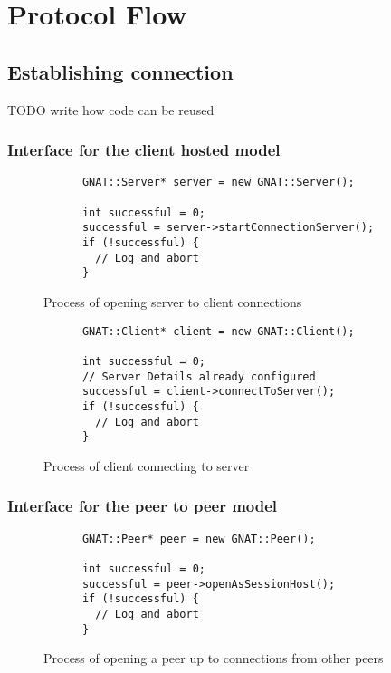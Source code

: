 
\newpage

\section{Protocol Flow}

\subsection{Establishing connection}
TODO write how code can be reused



\newpage
\subsubsection{Interface for the client hosted model}

\begin{figure}[!h]
  \centering
  \begin{lstlisting}
      GNAT::Server* server = new GNAT::Server();

      int successful = 0;
      successful = server->startConnectionServer();
      if (!successful) {
        // Log and abort
      }
  \end{lstlisting}
  \caption{Process of opening server to client connections}
  \label{code:server_conn}
\end{figure}

\begin{figure}[!h]
  \centering
  \begin{lstlisting}
      GNAT::Client* client = new GNAT::Client();

      int successful = 0;
      // Server Details already configured
      successful = client->connectToServer();
      if (!successful) {
        // Log and abort
      }
  \end{lstlisting}
  \caption{Process of client connecting to server}
  \label{code:client_conn}
\end{figure}


\newpage
\subsubsection{Interface for the peer to peer model}

\begin{figure}[!h]
  \centering
  \begin{lstlisting}
      GNAT::Peer* peer = new GNAT::Peer();

      int successful = 0;
      successful = peer->openAsSessionHost();
      if (!successful) {
        // Log and abort
      }
  \end{lstlisting}
  \caption{Process of opening a peer up to connections from other peers}
  \label{code:peer_conn_host}
\end{figure}


